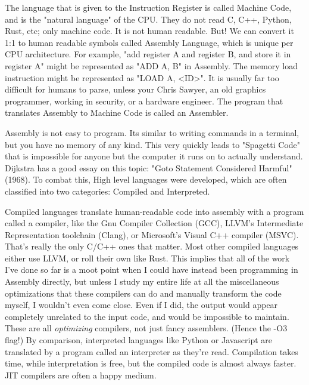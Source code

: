 \documentclass[%
 reprint,
 amsmath,amssymb,
 aps,
showkeys,
]{revtex4-2}
\begin{document}
The language that is given to the Instruction Register is called Machine Code, and is the "natural language" of the CPU. They do not read C, C++, Python, Rust, etc; only machine code. It is not human readable. But! We can convert it 1:1 to human readable symbols called Assembly Language, which is unique per CPU architecture. For example, "add register A and register B, and store it in register A" might be represented as "ADD A, B" in Assembly. The memory load instruction might be represented as "LOAD A, <ID>". It is usually far too difficult for humans to parse, unless your Chris Sawyer, an old graphics programmer, working in security, or a hardware engineer. The program that translates Assembly to Machine Code is called an Assembler.

Assembly is not easy to program. Its similar to writing commands in a terminal, but you have no memory of any kind. This very quickly leads to "Spagetti Code" that is impossible for anyone but the computer it runs on to actually understand. Dijkstra has a good essay on this topic: "Goto Statement Considered Harmful" (1968). To combat this,  High level languages were developed, which are often classified into two categories: Compiled and Interpreted.

Compiled languages translate human-readable code into assembly with a program called a compiler, like the Gnu Compiler Collection (GCC), LLVM's Intermediate Representation toolchain (Clang), or Microsoft's Visual C++ compiler (MSVC). That's really the only C/C++ ones that matter. Most other compiled languages either use LLVM, or roll their own like Rust. This implies that all of the work I've done so far is a moot point when I could have instead been programming in Assembly directly, but unless I study my entire life at all the miscellaneous optimizations that these compilers can do and manually transform the code myself, I wouldn't even come close. Even if I did, the output would appear completely unrelated to the input code, and would be impossible to maintain. These are all \textit{optimizing} compilers, not just fancy assemblers. (Hence the -O3 flag!) By comparison, interpreted languages like Python or Javascript are translated by a program called an interpreter as they're read. Compilation takes time, while interpretation is free, but the compiled code is almost always faster. JIT compilers are often a happy medium. 
\end{document}
